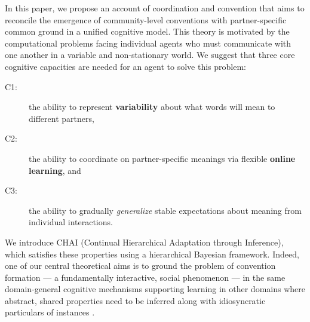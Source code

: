 In this paper, we propose an account of coordination and convention that aims to reconcile the emergence of community-level conventions with partner-specific common ground in a unified cognitive model.
This theory is motivated by the computational problems facing individual agents who must communicate with one another in a variable and non-stationary world. 
We suggest that three core cognitive capacities are needed for an agent to solve this problem:
\begin{description}
\item[C1:] the ability to represent \textbf{variability} about what words will mean to different partners,
\item[C2:] the ability to coordinate on partner-specific meanings via flexible \textbf{online learning}, and
\item[C3:] the ability to gradually \emph{generalize} stable expectations about meaning from individual interactions.
\end{description}
We introduce CHAI (Continual Hierarchical Adaptation through Inference), which satisfies these properties using a hierarchical Bayesian framework.
Indeed, one of our central theoretical aims is to ground the problem of convention formation --- a fundamentally interactive, social phenomenon --- in the same domain-general cognitive mechanisms supporting learning in other domains where abstract, shared properties need to be inferred along with idiosyncratic particulars of instances \cite{berniker2008estimating,GoodmanUllmanTenenbaum11_TheoryOfCausality,tenenbaum_how_2011,kleinschmidt2015robust}.

